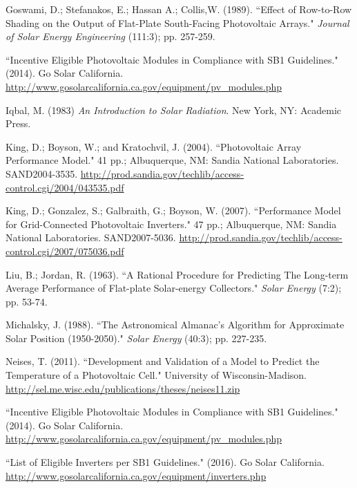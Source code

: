 \documentclass[12pt,letterpaper]{article}
\begin{document}
\begin{thebibliography}{99}
 Goswami, D.; Stefanakos, E.; Hassan A.; Collis,W. (1989). ``Effect of Row-to-Row Shading on the Output of Flat-Plate South-Facing Photovoltaic Arrays." \textit{Journal of Solar Energy Engineering} (111:3); pp. 257-259.

 ``Incentive Eligible Photovoltaic Modules in Compliance with SB1 Guidelines." (2014). Go Solar California. \url{http://www.gosolarcalifornia.ca.gov/equipment/pv_modules.php}

 Iqbal, M. (1983) \textit{An Introduction to Solar 
Radiation}. New York, NY: Academic Press.

  King, D.; Boyson, W.; and Kratochvil, J. (2004). ``Photovoltaic Array Performance Model." 41 pp.; Albuquerque, NM: Sandia National Laboratories. SAND2004-3535. \url{http://prod.sandia.gov/techlib/access-control.cgi/2004/043535.pdf}

 King, D.; Gonzalez, S.; Galbraith, G.; Boyson, W. (2007). ``Performance Model for Grid-Connected Photovoltaic Inverters." 47 pp.; Albuquerque, NM: Sandia National Laboratories. SAND2007-5036. \url{http://prod.sandia.gov/techlib/access-control.cgi/2007/075036.pdf}

 Liu, B.; Jordan, R. (1963). ``A Rational Procedure for Predicting The Long-term Average Performance of Flat-plate Solar-energy Collectors." \textit{Solar Energy} (7:2); pp. 53-74.

 Michalsky, J. (1988). ``The Astronomical Almanac's Algorithm for Approximate Solar Position (1950-2050)." \textit{Solar Energy} (40:3); pp. 227-235.

 Neises, T. (2011). ``Development and Validation of a Model to Predict the Temperature of a Photovoltaic Cell." University of Wisconsin-Madison. \url{http://sel.me.wisc.edu/publications/theses/neises11.zip}

 ``Incentive Eligible Photovoltaic Modules in Compliance with SB1 Guidelines." (2014). Go Solar California. \url{http://www.gosolarcalifornia.ca.gov/equipment/pv_modules.php}

 ``List of Eligible Inverters per SB1 Guidelines." (2016). Go Solar California. \url{http://www.gosolarcalifornia.ca.gov/equipment/inverters.php}


\end{thebibliography}
\end{document}
